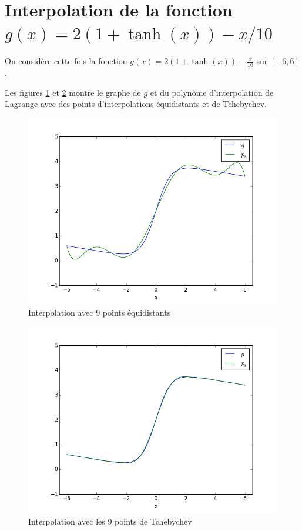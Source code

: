\section{Interpolation de la fonction $g(x) = 2(1+\tanh(x)) - x/10 $}

On considère cette fois la fonction $g(x) = 2(1+\tanh(x)) - \frac{x}{10}$ sur $[-6, 6]$. 

Les figures \ref{fig:2:ptsUniform} et \ref{fig:2:ptsTcheby} montre 
le graphe de $g$ et du polynôme d'interpolation de Lagrange avec 
des points d'interpolations équidistants et de Tchebychev.

\begin{figure}[h]
  \centering
  \includegraphics[scale=0.5]{fig3}
  \caption{Interpolation avec 9 points équidistants}
  \label{fig:2:ptsUniform}
\end{figure}


\begin{figure}[h]
  \centering
  \includegraphics[scale=0.5]{fig4}
  \caption{Interpolation avec les 9 points de Tchebychev}
  \label{fig:2:ptsTcheby}
\end{figure}


